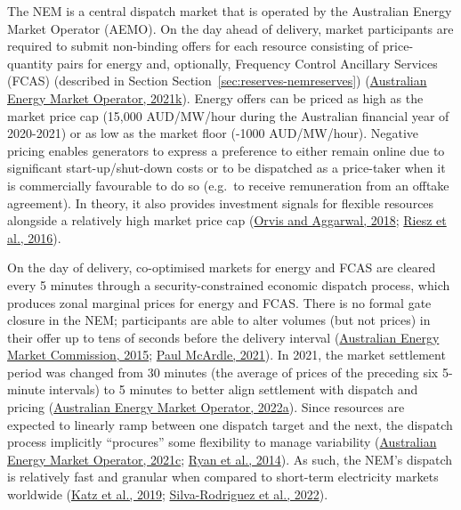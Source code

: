 \documentclass[12pt,a4paper,]{report}
\begin{document}
The NEM is a central dispatch market that is operated by the Australian
Energy Market Operator (AEMO). On the day ahead of delivery, market
participants are required to submit non-binding offers for each resource
consisting of price-quantity pairs for energy and, optionally, Frequency
Control Ancillary Services (FCAS) (described in Section
Section~\ref{sec:reserves-nemreserves})
(\protect\hyperlink{ref-australianenergymarketoperatorPredispatchOperatingProcedure2021}{Australian
Energy Market Operator, 2021k}). Energy offers can be priced as high as
the market price cap (15,000 AUD/MW/hour during the Australian financial
year of 2020-2021) or as low as the market floor (-1000 AUD/MW/hour).
Negative pricing enables generators to express a preference to either
remain online due to significant start-up/shut-down costs or to be
dispatched as a price-taker when it is commercially favourable to do so
(e.g.~to receive remuneration from an offtake agreement). In theory, it
also provides investment signals for flexible resources alongside a
relatively high market price cap
(\protect\hyperlink{ref-orvisRefiningCompetitiveElectricity2018}{Orvis
and Aggarwal, 2018};
\protect\hyperlink{ref-rieszAssessingViabilityEnergyonly2016}{Riesz et
al., 2016}).

On the day of delivery, co-optimised markets for energy and FCAS are
cleared every 5 minutes through a security-constrained economic dispatch
process, which produces zonal marginal prices for energy and FCAS. There
is no formal gate closure in the NEM; participants are able to alter
volumes (but not prices) in their offer up to tens of seconds before the
delivery interval
(\protect\hyperlink{ref-australianenergymarketcommissionBiddingGoodFaith2015}{Australian
Energy Market Commission, 2015};
\protect\hyperlink{ref-paulmcardleTwoRecentImprovements2021}{Paul
McArdle, 2021}). In 2021, the market settlement period was changed from
30 minutes (the average of prices of the preceding six 5-minute
intervals) to 5 minutes to better align settlement with dispatch and
pricing
(\protect\hyperlink{ref-australianenergymarketoperator5MSCommencement2022}{Australian
Energy Market Operator, 2022a}). Since resources are expected to
linearly ramp between one dispatch target and the next, the dispatch
process implicitly ``procures'' some flexibility to manage variability
(\protect\hyperlink{ref-australianenergymarketoperatorDispatchStandardOperating2019}{Australian
Energy Market Operator, 2021c};
\protect\hyperlink{ref-ryanVariableGenerationReserves2014}{Ryan et al.,
2014}). As such, the NEM's dispatch is relatively fast and granular when
compared to short-term electricity markets worldwide
(\protect\hyperlink{ref-katzOpeningMarketsDesigning2019}{Katz et al.,
2019};
\protect\hyperlink{ref-silva-rodriguezShortTermWholesale2022}{Silva-Rodriguez
et al., 2022}).
\end{document}

